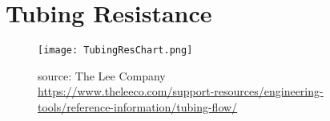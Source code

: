 \documentclass[letterpaper]{article}
\begin{document}
%

\section{Tubing Resistance}


\begin{figure}
\texttt{[image: TubingResChart.png]}
\caption{source: The Lee Company  \\ \url{https://www.theleeco.com/support-resources/engineering-tools/reference-information/tubing-flow/}}
\end{figure}
\end{document}
